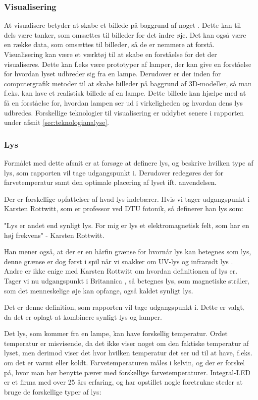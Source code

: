 \subsubsection{Visualisering}
At visualisere betyder at skabe et billede på baggrund af noget \cite{ddo_visualisering}. Dette kan til dels være tanker, som omsættes til billeder for det indre øje. Det kan også være en række data, som omsættes til billeder, så de er nemmere at forstå.
Visualisering kan være et værktøj til at skabe en forståelse for det der visualiseres. Dette kan f.eks være prototyper af lamper, der kan give en forståelse for hvordan lyset udbreder sig fra en lampe. Derudover er der inden for computergrafik metoder til at skabe billeder på baggrund af 3D-modeller, så man f.eks. kan lave et realistisk billede af en lampe. Dette billede kan hjælpe med at få en forståelse for, hvordan lampen ser ud i virkeligheden og hvordan dens lys udbredes. Forskellige teknologier til visualisering er uddybet senere i rapporten under afsnit \ref{sec:teknologianalyse}. 

\subsubsection{Lys}
Formålet med dette afsnit er at forsøge at definere lys, og beskrive hvilken type af lys, som rapporten vil tage udgangspunkt i. Derudover redegøres der for farvetemperatur samt den optimale placering af lyset ift. anvendelsen.


Der er forskellige opfattelser af hvad lys indebærer. Hvis vi tager udgangspunkt i Karsten Rottwitt, som er professor ved DTU fotonik, så definerer han lys som:


"Lys er andet end synligt lys. For mig er lys et elektromagnetisk felt, som har en høj frekvens"
- Karsten Rottwitt\cite{def_lys}.

Han mener også, at der er en hårfin grænse for hvornår lys kan betegnes som lys, denne grænse er dog først i spil når vi snakker om UV-lys og infrarødt lys \cite{def_lys}. 
Andre er ikke enige med Karsten Rottwitt om hvordan definitionen af lys er. Tager vi nu udgangspunkt i Britannica \cite{britannica_lys}, så betegnes lys, som magnetiske stråler, som det menneskelige øje kan opfange, også kaldet synligt lys. 


Det er denne definition, som rapporten vil tage udgangspunkt i. Dette er valgt, da det er oplagt at kombinere synligt lys og lamper.

Det lys, som kommer fra en lampe, kan have forskellig temperatur. Ordet temperatur er misvisende, da det ikke viser noget om den faktiske temperatur af lyset, men derimod viser det hvor hvilken temperatur det ser ud til at have, f.eks. om det er varmt eller koldt. Farvetemperaturen måles i kelvin, og der er forskel på, hvor man bør benytte pærer med forskellige farvetemperaturer. Integral-LED er et firma med over 25 års erfaring\cite{integral_led}, og har opstillet nogle foretrukne steder at bruge de forskellige typer af lys:

